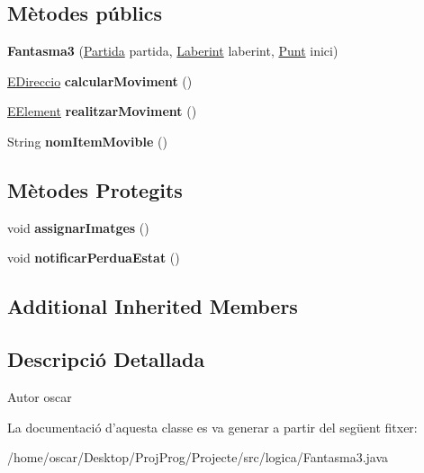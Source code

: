 \subsection*{Mètodes públics}
\begin{DoxyCompactItemize}
\item 
\hypertarget{classlogica_1_1_fantasma3_a282c4af4b988e9d0b43bc23f454ff72e}{{\bfseries Fantasma3} (\hyperlink{classlogica_1_1_partida}{Partida} partida, \hyperlink{classlogica_1_1laberints_1_1_laberint}{Laberint} laberint, \hyperlink{classlogica_1_1_punt}{Punt} inici)}\label{classlogica_1_1_fantasma3_a282c4af4b988e9d0b43bc23f454ff72e}

\item 
\hypertarget{classlogica_1_1_fantasma3_a91a5d6c42601d67d3696d733d1f8a8ee}{\hyperlink{enumlogica_1_1enumeracions_1_1_e_direccio}{E\+Direccio} {\bfseries calcular\+Moviment} ()}\label{classlogica_1_1_fantasma3_a91a5d6c42601d67d3696d733d1f8a8ee}

\item 
\hypertarget{classlogica_1_1_fantasma3_a5f672e3c66668eb5fd33d34e2e5efdac}{\hyperlink{enumlogica_1_1enumeracions_1_1_e_element}{E\+Element} {\bfseries realitzar\+Moviment} ()}\label{classlogica_1_1_fantasma3_a5f672e3c66668eb5fd33d34e2e5efdac}

\item 
\hypertarget{classlogica_1_1_fantasma3_a4c111994855d2c11600f301de6a449fa}{String {\bfseries nom\+Item\+Movible} ()}\label{classlogica_1_1_fantasma3_a4c111994855d2c11600f301de6a449fa}

\end{DoxyCompactItemize}
\subsection*{Mètodes Protegits}
\begin{DoxyCompactItemize}
\item 
\hypertarget{classlogica_1_1_fantasma3_aef966f328672a3faffa43a66d0520e6f}{void {\bfseries assignar\+Imatges} ()}\label{classlogica_1_1_fantasma3_aef966f328672a3faffa43a66d0520e6f}

\item 
\hypertarget{classlogica_1_1_fantasma3_a409c7884b9d1f31392fe45786c7e1502}{void {\bfseries notificar\+Perdua\+Estat} ()}\label{classlogica_1_1_fantasma3_a409c7884b9d1f31392fe45786c7e1502}

\end{DoxyCompactItemize}
\subsection*{Additional Inherited Members}


\subsection{Descripció Detallada}
\begin{DoxyAuthor}{Autor}
oscar 
\end{DoxyAuthor}


La documentació d'aquesta classe es va generar a partir del següent fitxer\+:\begin{DoxyCompactItemize}
\item 
/home/oscar/\+Desktop/\+Proj\+Prog/\+Projecte/src/logica/Fantasma3.\+java\end{DoxyCompactItemize}
